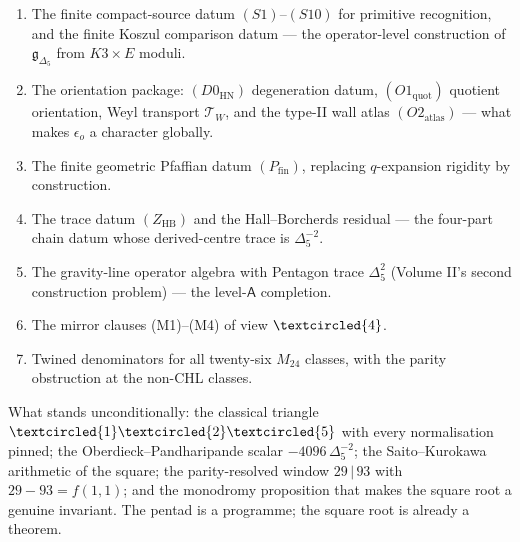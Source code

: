 \documentclass[11pt]{article}
\providecommand{\fg}{\mathfrak{g}}
\providecommand{\Dfive}{\Delta_5}
\begin{document}
\begin{enumerate}
\item The finite compact-source datum $(S1)$--$(S10)$ for primitive
recognition, and the finite Koszul comparison datum --- the operator-level
construction of $\fg_{\Dfive}$ from $K3\times E$ moduli.
\item The orientation package: $(D0_{\mathrm{HN}})$ degeneration
datum, $(O1_{\mathrm{quot}})$ quotient orientation,
Weyl transport $\mathcal T_W$, and the type-II wall atlas
$(O2_{\mathrm{atlas}})$ --- what makes $\epsilon_o$ a character
globally.
\item The finite geometric Pfaffian datum $(P_{\mathrm{fin}})$,
replacing $q$-expansion rigidity by construction.
\item The trace datum $(Z_{\mathrm{HB}})$ and the Hall--Borcherds
residual --- the four-part chain datum whose derived-centre trace is
$\Dfive^{-2}$.
\item The gravity-line operator algebra with Pentagon trace
$\Dfive^2$ \textup{(Volume II's second construction problem)} --- the
level-$\mathsf A$ completion.
\item The mirror clauses \textup{(M1)}--\textup{(M4)} of view
$\textcircled{4}$.
\item Twined denominators for all twenty-six $M_{24}$ classes, with
the parity obstruction at the non-CHL classes.
\end{enumerate}

What stands unconditionally: the classical triangle
$\textcircled{1}\textcircled{2}\textcircled{5}$ with every
normalisation pinned; the Oberdieck--Pandharipande scalar
$-4096\,\Dfive^{-2}$; the Saito--Kurokawa arithmetic of the square;
the parity-resolved window $29\,|\,93$ with $29-93=f(1,1)$; and the
monodromy proposition that makes the square root a genuine invariant.
The pentad is a programme; the square root is already a theorem.
\end{document}
